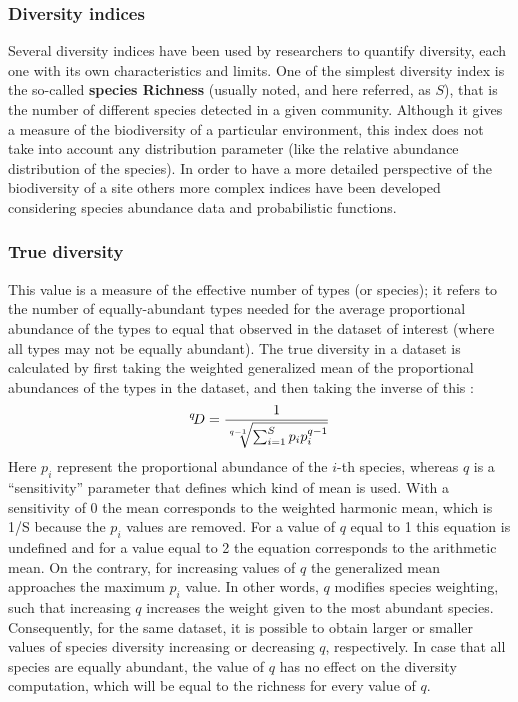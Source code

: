 \subsubsection{Diversity indices}
Several diversity indices have been used by researchers to quantify diversity, each one with its own characteristics and limits. One of the simplest diversity index is the so-called \textbf{species Richness} (usually noted, and here referred, as $S$), that is the number of different species detected in a given community. Although it gives a measure of the biodiversity of a particular environment, this index does not take into account any distribution parameter (like the relative abundance distribution of the species). In order to have a more detailed perspective of the biodiversity of a site others more complex indices have been developed considering species abundance data and probabilistic functions.\\

\subsubsection*{True diversity\label{par:tdiversity}}
This value is a measure of the effective number of types (or species); it refers to the number of equally-abundant types needed for the average proportional abundance of the types to equal that observed in the dataset of interest (where all types may not be equally abundant). The true diversity in a dataset is calculated by first taking the weighted generalized mean of the proportional abundances of the types in the dataset, and then taking the inverse of this \cite{tuomisto2010diversity}:
\begin{equation*}
{}^q\!D={1 \over \sqrt[q-1]{{\sum_{i=1}^S p_i p_i^{q-1}}}}
\end{equation*}
Here $p_i$ represent the proportional abundance of the $i$-th species, whereas $q$ is a ``sensitivity'' parameter that defines which kind of mean is used. With a sensitivity of 0 the mean corresponds to the weighted harmonic mean, which is 1/S because the $p_i$ values are removed. For a value of $q$ equal to 1 this equation is undefined and for a value equal to 2 the equation corresponds to the arithmetic mean. On the contrary, for increasing values of $q$ the generalized mean approaches the maximum $p_i$ value. In other words, $q$ modifies species weighting, such that increasing $q$ increases the weight given to the most abundant species. Consequently, for the same dataset, it is possible to obtain larger or smaller values of species diversity increasing or decreasing $q$, respectively. In case that all species are equally abundant, the value of $q$ has no effect on the diversity computation, which will be equal to the richness for every value of $q$.\\

